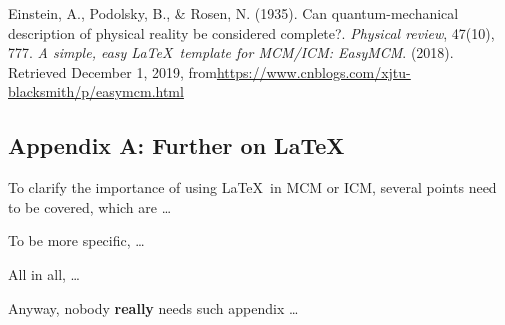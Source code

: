 \documentclass[12pt]{article}  %
\begin{document}
\begin{thebibliography}{99}
 Einstein, A., Podolsky, B., \& Rosen, N. (1935). Can quantum-mechanical description of physical reality be considered complete?. \emph{Physical review}, 47(10), 777.
 \emph{A simple, easy \LaTeX\ template for MCM/ICM: EasyMCM}. (2018). Retrieved December 1, 2019, from\url{https://www.cnblogs.com/xjtu-blacksmith/p/easymcm.html}
\end{thebibliography}


\begin{subappendices}  %

\section{Appendix A: Further on \LaTeX}
To clarify the importance of using \LaTeX\ in MCM or ICM, several points need to be covered, which are \ldots

To be more specific, \ldots

All in all, \ldots

Anyway, nobody \textbf{really} needs such appendix \ldots

\end{subappendices}
\end{document}
